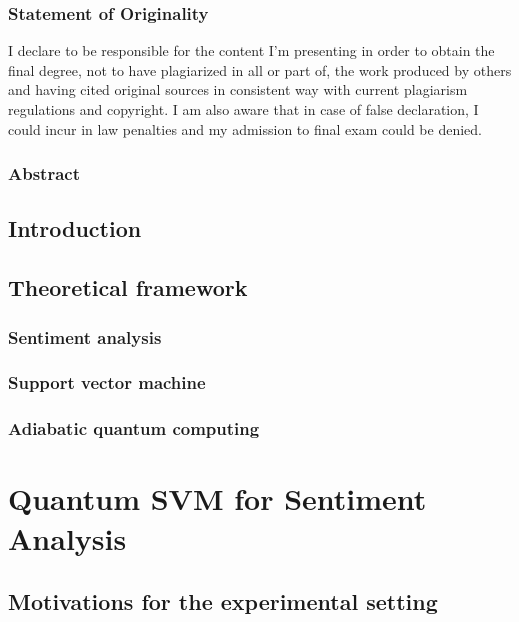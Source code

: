 \documentclass[11pt, oneside]{book}
\begin{document}

\newpage

\vfill
\section*{Statement of Originality}
I declare to be responsible for the content I’m presenting in order to obtain the final degree, not to have plagiarized in all or part of, the work produced by others and having cited original sources in consistent way with current plagiarism regulations and copyright. I am also aware that in case of false declaration, I could incur in law penalties and my admission to final exam could be denied.
\newpage



\newpage

\section*{Abstract}
\newpage

\tableofcontents
\newpage

\chapter{Introduction}

\chapter{Theoretical framework}
\section{Sentiment analysis}
\section{Support vector machine}
\section{Adiabatic quantum computing}

\part{Quantum SVM for Sentiment Analysis}

\chapter{Motivations for the experimental setting}
\end{document}
